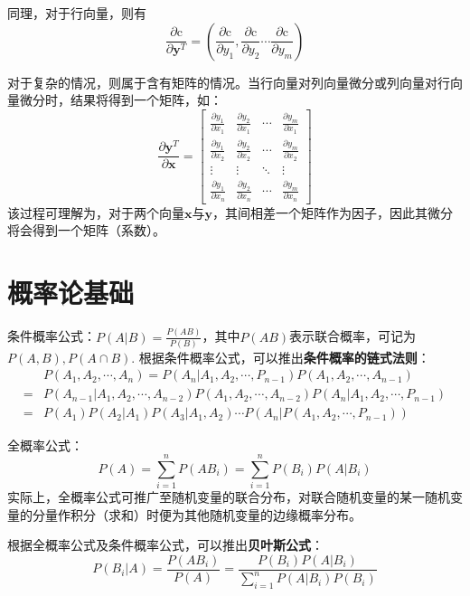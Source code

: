 \documentclass[12pt,a4paper]{article}
\begin{document}
  同理，对于行向量，则有
  $$
  \frac{\partial \mathrm{c}}{\partial \boldsymbol{y}^{T}}=\left(\frac{\partial \mathrm{c}}{\partial y_{1}}, \frac{\partial \mathrm{c}}{\partial y_{2}} \cdots \frac{\partial \mathrm{c}}{\partial y_{m}}\right)
  $$

  对于复杂的情况，则属于含有矩阵的情况。当行向量对列向量微分或列向量对行向量微分时，结果将得到一个矩阵，如：
  $$
  \frac{\partial \boldsymbol{y}^{T}}{\partial \boldsymbol{x}}=\left[\begin{array}{cccc}{\frac{\partial y_{1}}{\partial x_{1}}} & {\frac{\partial y_{2}}{\partial x_{1}}} & {\cdots} & {\frac{\partial y_{m}}{\partial x_{1}}} \\ {\frac{\partial y_{1}}{\partial x_{2}}} & {\frac{\partial y_{2}}{\partial x_{2}}} & {\cdots} & {\frac{\partial y_{m}}{\partial x_{2}}} \\ {\vdots} & {\vdots} & {\ddots} & {\vdots} \\ {\frac{\partial y_{1}}{\partial x_{n}}} & {\frac{\partial y_{2}}{\partial x_{n}}} & {\cdots} & {\frac{\partial y_{m}}{\partial x_{n}}}\end{array}\right]
  $$
  该过程可理解为，对于两个向量$\mathbf{x}$与$\mathbf{y}$，其间相差一个矩阵作为因子，因此其微分将会得到一个矩阵（系数）。

  \section{概率论基础}
  条件概率公式：$P(A|B)=\frac{P(AB)}{P(B)}$，其中$P(AB)$表示联合概率，可记为$P(A,B), P(A\cap B)$. 根据条件概率公式，可以推出\textbf{条件概率的链式法则}：
  $$\begin{aligned}
    &P(A_1, A_2, \cdots, A_n)=P(A_n|A_1, A_2, \cdots, P_{n-1})P(A_1, A_2, \cdots, A_{n-1}) \\ 
    =& P(A_{n-1}|A_1, A_2, \cdots, A_{n-2})P(A_1, A_2, \cdots, A_{n-2})P(A_n|A_1, A_2, \cdots, P_{n-1}) \\ 
    =& P(A_1)P(A_2|A_1)P(A_3|A_1,A_2)\cdots P(A_n|P(A_1, A_2, \cdots, P_{n-1}))
  \end{aligned}$$

  全概率公式：
  $$P(A)=\sum\limits_{i=1}^n P(AB_i)=\sum\limits_{i=1}^n P(B_i)P(A|B_i)$$
  实际上，全概率公式可推广至随机变量的联合分布，对联合随机变量的某一随机变量的分量作积分（求和）时便为其他随机变量的边缘概率分布。

  根据全概率公式及条件概率公式，可以推出\textbf{贝叶斯公式}：
  $$
  P(B_i|A)= \frac{P(AB_i)}{P(A)} = \frac{P(B_i)P(A|B_i)}{\sum_{i=1}^n P(A|B_i)P(B_i)}
  $$
\end{document}
